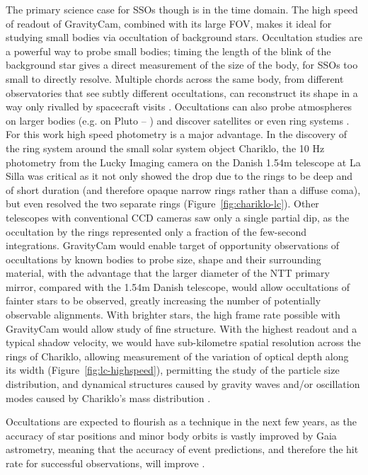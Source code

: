 \documentclass{pasa}%
\begin{document}
  The primary science case for SSOs though is in the time domain. The
  high speed of readout of GravityCam, combined with its large FOV,
  makes it ideal for studying small bodies via occultation of background
  stars. Occultation studies are a powerful way to probe small bodies;
  timing the length of the blink of the background star gives a direct
  measurement of the size of the body, for SSOs too small to directly
  resolve. Multiple chords across the same body, from different
  observatories that see subtly different occultations, can reconstruct
  its shape in a way only rivalled by spacecraft visits
  \citep{Durech-Ast4}. Occultations
  can also probe atmospheres on larger bodies (e.g. on Pluto --
  \citealt{Dias-Oliveira2015,Sicardy2016}) and discover satellites
  \citep{2013-PSS-87-Timerson} or even ring systems
  \citep{Hubbard1986,Chariklo}. For this work high speed photometry is a
  major advantage. In the discovery of the ring system around the
  small solar system object Chariklo, the 10 Hz photometry from the Lucky Imaging camera
  \citep{Skottfelt+2015} on the Danish 1.54m telescope at La Silla was
  critical as it not only showed the drop due to the rings to be deep
  and of short duration (and therefore opaque narrow rings rather than a
  diffuse coma), but even resolved the two separate rings (Figure~\ref{fig:chariklo-lc}). Other
  telescopes with conventional CCD cameras saw only a single partial
  dip, as the occultation by the rings represented only a fraction of
  the few-second integrations. GravityCam would enable target
  of opportunity observations of occultations by known bodies to probe
  size, shape and their surrounding material, with the advantage that
  the larger diameter of the NTT primary mirror, compared with the 1.54m
  Danish telescope, would allow occultations of fainter stars to be
  observed, greatly increasing the number of potentially observable
  alignments. 
  With brighter stars, the high frame rate possible with GravityCam would allow  study of  fine structure. With the highest readout and a typical shadow velocity, we would have sub-kilometre spatial resolution across the rings of Chariklo, allowing measurement of the variation of  optical depth along its width (Figure~\ref{fig:lc-highspeed}), permitting the study of the particle size distribution, and dynamical structures caused by gravity waves and/or oscillation modes caused by Chariklo's mass distribution \citep{Michikoshi2017}.
  
  Occultations are expected to flourish as a technique in
  the next few years, as the accuracy of star positions and minor body
  orbits is vastly improved by Gaia astrometry, meaning that the
  accuracy of event predictions, and therefore the hit rate for
  successful observations, will improve
  \citep{2007-AA-474-Tanga}. 
\end{document}
